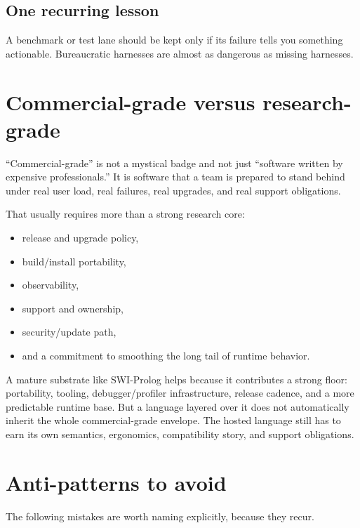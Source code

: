 \documentclass[11pt]{article}
\begin{document}
\subsection{One recurring lesson}
A benchmark or test lane should be kept only if its failure tells you something actionable. Bureaucratic harnesses are almost as dangerous as missing harnesses.

\section{Commercial-grade versus research-grade}
``Commercial-grade'' is not a mystical badge and not just ``software written by expensive professionals.'' It is software that a team is prepared to stand behind under real user load, real failures, real upgrades, and real support obligations.

That usually requires more than a strong research core:
\begin{itemize}
  \item release and upgrade policy,
  \item build/install portability,
  \item observability,
  \item support and ownership,
  \item security/update path,
  \item and a commitment to smoothing the long tail of runtime behavior.
\end{itemize}

A mature substrate like SWI-Prolog helps because it contributes a strong floor: portability, tooling, debugger/profiler infrastructure, release cadence, and a more predictable runtime base. But a language layered over it does not automatically inherit the whole commercial-grade envelope. The hosted language still has to earn its own semantics, ergonomics, compatibility story, and support obligations.

\section{Anti-patterns to avoid}
The following mistakes are worth naming explicitly, because they recur.
\end{document}
